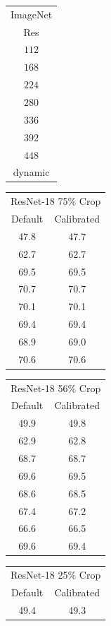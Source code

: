 \begin{table}[t]
    \centering
    \begin{tabular}{c|}
    ImageNet\\
    Res \\
    \hline
    $112$ \\ 
    $168$ \\ 
    $224$ \\ 
    $280$ \\ 
    $336$ \\ 
    $392$ \\ 
    $448$ \\
    dynamic\\
    \end{tabular}
    \begin{tabular}{|c|c|}
    \multicolumn{2}{|c|}{ ResNet-18 75\% Crop}\\
    Default & Calibrated \\
    \hline
    47.8 & 47.7\\
    62.7 & 62.7\\ 
    69.5 & 69.5\\ 
    70.7 & 70.7\\ 
    70.1 & 70.1\\ 
    69.4 & 69.4\\ 
    68.9 & 69.0\\
    70.6 & 70.6\\ 
    \end{tabular}
    \begin{tabular}{|c|c|}
    \multicolumn{2}{|c|}{ ResNet-18 56\% Crop}\\
    Default & Calibrated  \\
    \hline
    49.9 & 49.8 \\ 
    62.9 & 62.8 \\ 
    68.7 & 68.7 \\ 
    69.6 & 69.5 \\ 
    68.6 & 68.5 \\ 
    67.4 & {\color{red}67.2} \\ 
    66.6 & 66.5 \\
    69.6 & {\color{red}69.4} \\ 
    \end{tabular}
    \begin{tabular}{|c|c|}
    \multicolumn{2}{|c|}{ ResNet-18 25\% Crop}\\
    Default & Calibrated  \\
    \hline
    49.4 & 49.3 \\ 

\end{tabular}
\end{table}
